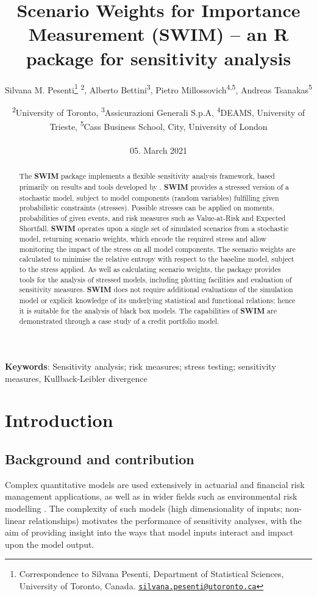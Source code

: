 \documentclass[
]{article}
\title{Scenario Weights for Importance Measurement (\textbf{SWIM}) -- an \textbf{R} package for sensitivity analysis}
\author{Silvana M. Pesenti\footnote{Correspondence to Silvana Pesenti, Department of Statistical Sciences, University of Toronto, Canada. \href{mailto:silvana.pesenti@utoronto.ca}{\nolinkurl{silvana.pesenti@utoronto.ca}}} \textsuperscript{2}, Alberto Bettini\textsuperscript{3}, Pietro Millossovich\textsuperscript{4,5}, Andreas Tsanakas\textsuperscript{5}}
\date{\textsuperscript{2}University of Toronto, \textsuperscript{3}Assicurazioni Generali S.p.A, \textsuperscript{4}DEAMS, University of Trieste, \textsuperscript{5}Cass Business School, City, University of London\\
~\\
05. March 2021}
\begin{document}
\maketitle
\begin{abstract}
The \textbf{SWIM} package implements a flexible sensitivity analysis framework, based primarily on results and tools developed by \citet{Pesenti2019}. \textbf{SWIM} provides a stressed version of a stochastic model, subject to model components (random variables) fulfilling given probabilistic constraints (stresses). Possible stresses can be applied on moments, probabilities of given events, and risk measures such as Value-at-Risk and Expected Shortfall. \textbf{SWIM} operates upon a single set of simulated scenarios from a stochastic model, returning scenario weights, which encode the required stress and allow monitoring the impact of the stress on all model components. The scenario weights are calculated to minimise the relative entropy with respect to the baseline model, subject to the stress applied. As well as calculating scenario weights, the package provides tools for the analysis of stressed models, including plotting facilities and evaluation of sensitivity measures. \textbf{SWIM} does not require additional evaluations of the simulation model or explicit knowledge of its underlying statistical and functional relations; hence it is suitable for the analysis of black box models. The capabilities of \textbf{SWIM} are demonstrated through a case study of a credit portfolio model.
\end{abstract}

\textbf{Keywords}: Sensitivity analysis; risk measures; stress testing; sensitivity measures, Kullback-Leibler divergence

\hypertarget{introduction}{%
\section{Introduction}\label{introduction}}

\hypertarget{background-and-contribution}{%
\subsection{Background and contribution}\label{background-and-contribution}}

Complex quantitative models are used extensively in actuarial and financial risk management applications, as well as in wider fields such as environmental risk modelling \citep{Tsanakas2016b, Borgonovo2016, Pesenti2019}. The complexity of such models (high dimensionality of inputs; non-linear relationships) motivates the performance of sensitivity analyses, with the aim of providing insight into the ways that model inputs interact and impact upon the model output.
\end{document}
